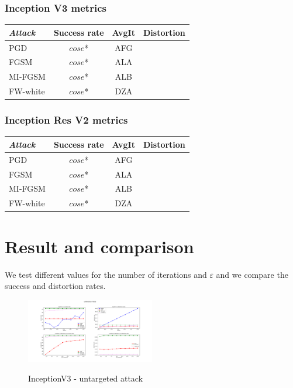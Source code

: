\documentclass[10pt,twocolumn,letterpaper, english]{article}
\theoremstyle{definition}
\theoremstyle{plain}
\theoremstyle{plain}
\theoremstyle{plain}
\theoremstyle{plain}
\theoremstyle{remark}
\theoremstyle{remark}
\theoremstyle{definition}
\theoremstyle{definition}
\theoremstyle{definition}
\theoremstyle{definition}
\renewcommand{\epsilon}{\varepsilon}
\begin{document}
\subsubsection{Inception V3 metrics}

\begin{center}
    

\begin{tabular}{ |l|c|c|c| }
 \hline
  \textit{Attack} & Success rate & AvgIt & Distortion \\
 \hline
 
 PGD   & $cose$*   &  AFG &\\
 FGSM&   $cose$*  & ALA  &  \\
 MI-FGSM & $cose$* & ALB &\\
 FW-white & $cose$* & DZA &\\
\hline
\end{tabular}
\end{center}


\subsubsection{Inception Res V2 metrics}

\begin{center}
    

\begin{tabular}{ |l|c|c|c| }
 \hline
  \textit{Attack} & Success rate & AvgIt & Distortion \\
 \hline
 
 PGD   & $cose$*   &  AFG &\\
 FGSM&   $cose$*  & ALA  &  \\
 MI-FGSM & $cose$* & ALB &\\
 FW-white & $cose$* & DZA &\\
\hline
\end{tabular}
\end{center}


\section{Result and comparison}


We test different values for the number of iterations and $\epsilon$ and we compare the success and distortion rates. 

\begin{figure}[H]
  \centering
  \includegraphics[width=0.5\textwidth]{report_template/Images/inceptionv3_untargeted_grid.pdf}\\
  \caption{InceptionV3 - untargeted attack } \label{incV3-unt}
\end{figure}
\end{document}
